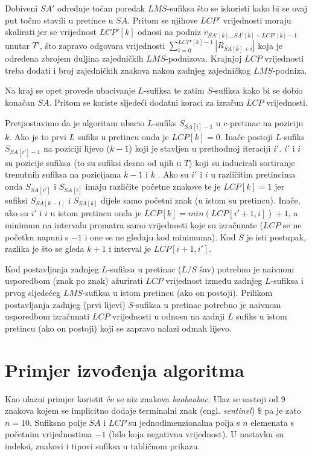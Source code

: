 \documentclass[times, utf8, proizvoljni, numeric]{fer}
\begin{document}
Dobiveni $SA'$ određuje točan poredak $LMS$-sufiksa što se iskoristi kako bi se ovaj put točno stavili u pretince u $SA$. Pritom se njihove $LCP'$ vrijednosti moraju skalirati jer se vrijednost $LCP'[k]$ odnosi na podniz $v_{SA'[k]...SA'[k]+LCP'[k]-1}$ unutar $T'$, što zapravo odgovara vrijednosti $\sum_{i=0}^{LCP'[k]-1}|R_{SA[k]+i}|$ koja je određena zbrojem duljina zajedničkih $LMS$-podnizova. Krajnjoj $LCP$ vrijednosti treba dodati i broj zajedničkih znakova nakon zadnjeg zajedničkog $LMS$-podniza.

Na kraj se opet provede ubacivanje $L$-sufiksa te zatim $S$-sufiksa kako bi se dobio konačan $SA$. Pritom se koriste sljedeći dodatni koraci za izračun $LCP$ vrijednosti.

Pretpostavimo da je algoritam ubacio $L$-sufiks $S_{SA[i]-1}$ u $c$-pretinac na poziciju $k$. Ako je to prvi $L$ sufiks u pretincu onda je $LCP[k]=0$. Inače postoji $L$-sufiks $S_{SA[i']-1}$ na poziciji lijevo ($k-1$) koji je stavljen u prethodnoj iteraciji $i'$. $i'$ i $i$ su pozicije sufiksa (to su sufiksi desno od njih u $T$) koji su inducirali sortiranje trenutnih sufiksa na pozicijama $k-1$ i $k$ . Ako su $i'$ i $i$ u različitim pretincima onda $S_{SA[i']}$ i $S_{SA[i]}$ imaju različite početne znakove te je $LCP[k]=1$ jer sufiksi $S_{SA[k-1]}$ i $S_{SA[k]}$ dijele samo početni znak (u istom su pretincu). Inače, ako su $i'$ i $i$ u istom pretincu onda je $LCP[k]=min(LCP[i'+1,i])+1$, a minimum na intervalu promatra samo vrijednosti koje su izračunate ($LCP$ se ne početku napuni s $-1$ i one se ne gledaju kod minimuma). Kod $S$ je isti postupak, razlika je što se gleda $k+1$ i interval je $LCP[i+1,i']$.

Kod postavljanja zadnjeg $L$-sufiksa u pretinac ($L/S$ šav) potrebno je naivnom usporedbom (znak po znak) ažurirati $LCP$ vrijednost između zadnjeg $L$-sufiksa i prvog sljedećeg $LMS$-sufiksa u istom pretincu (ako on postoji). Prilikom postavljanja zadnjeg (prvi lijevi) $S$-sufiksa u pretinac potrebno je naivnom usporedbom izračunati $LCP$ vrijednosti u odnosu na zadnji $L$ sufiks u istom pretincu (ako on postoji) koji se zapravo nalazi odmah lijevo.

\chapter{Primjer izvođenja algoritma}

Kao ulazni primjer koristit će se niz znakova \textit{baabaabac}. Ulaz se sastoji od 9 znakova kojem se implicitno dodaje terminalni znak (engl. \textit{sentinel}) $\$$ pa je zato $n=10$. Sufiksno polje $SA$ i $LCP$ su jednodimenzionalna polja s $n$ elemenata s početnim vrijednostima $-1$ (bilo koja negativna vrijednost). U nastavku su indeksi, znakovi i tipovi sufiksa u tabličnom prikazu.
\end{document}

